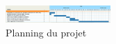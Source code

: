 \begin{figure}
  \begin{center}
    \includegraphics[angle=-90, width=4cm]{images/planning.png}
    \caption{Planning du projet}
    \label{fig:planning}
  \end{center}
\end{figure}
